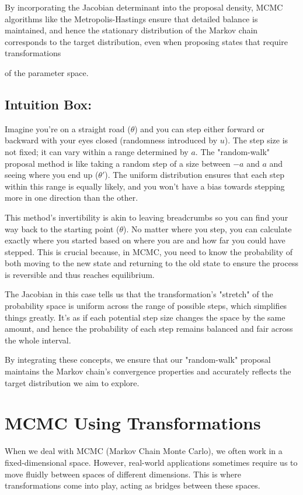 \documentclass[10pt]{article}
\begin{document}
By incorporating the Jacobian determinant into the proposal density, MCMC algorithms like the Metropolis-Hastings ensure that detailed balance is maintained, and hence the stationary distribution of the Markov chain corresponds to the target distribution, even when proposing states that require transformations

of the parameter space.

\subsection*{Intuition Box:}
Imagine you're on a straight road (\(\theta\)) and you can step either forward or backward with your eyes closed (randomness introduced by \(u\)). The step size is not fixed; it can vary within a range determined by \(a\). The "random-walk" proposal method is like taking a random step of a size between \(-a\) and \(a\) and seeing where you end up (\(\theta'\)). The uniform distribution ensures that each step within this range is equally likely, and you won't have a bias towards stepping more in one direction than the other.

This method's invertibility is akin to leaving breadcrumbs so you can find your way back to the starting point (\(\theta\)). No matter where you step, you can calculate exactly where you started based on where you are and how far you could have stepped. This is crucial because, in MCMC, you need to know the probability of both moving to the new state and returning to the old state to ensure the process is reversible and thus reaches equilibrium.

The Jacobian in this case tells us that the transformation's "stretch" of the probability space is uniform across the range of possible steps, which simplifies things greatly. It's as if each potential step size changes the space by the same amount, and hence the probability of each step remains balanced and fair across the whole interval.

By integrating these concepts, we ensure that our "random-walk" proposal maintains the Markov chain's convergence properties and accurately reflects the target distribution we aim to explore.

\section*{MCMC Using Transformations}
When we deal with MCMC (Markov Chain Monte Carlo), we often work in a fixed-dimensional space. However, real-world applications sometimes require us to move fluidly between spaces of different dimensions. This is where transformations come into play, acting as bridges between these spaces.
\end{document}
